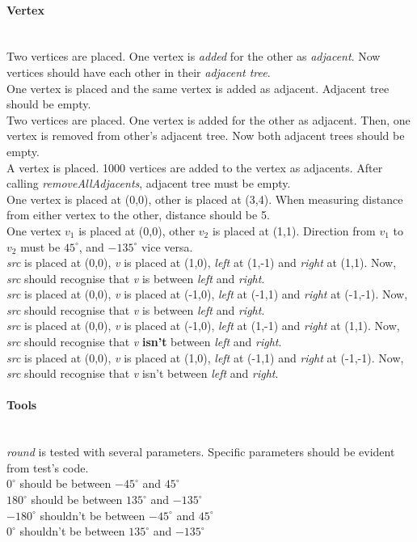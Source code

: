 \documentclass[a4paper,12pt]{article}
\begin{document}
\paragraph{\large Vertex} \hspace{0pt} \\
Two vertices are placed. One vertex is \emph{added} for the other as \emph{adjacent}. Now vertices should have each other in their \emph{adjacent tree}.\\
One vertex is placed and the same vertex is added as adjacent. Adjacent tree should be empty.\\
Two vertices are placed. One vertex is added for the other as adjacent. Then, one vertex is removed from other's adjacent tree. Now both adjacent trees should be empty.\\
A vertex is placed. 1000 vertices are added to the vertex as adjacents. After calling \emph{removeAllAdjacents}, adjacent tree must be empty.\\
One vertex is placed at (0,0), other is placed at (3,4). When measuring distance from either vertex to the other, distance should be 5.\\
One vertex \emph{$v_1$} is placed at (0,0), other \emph{$v_2$} is placed at (1,1). Direction from \emph{$v_1$} to \emph{$v_2$} must be $45^{\circ}$, and $-135^{\circ}$ vice versa.\\
\emph{src} is placed at (0,0), \emph{v} is placed at (1,0), \emph{left} at (1,-1) and \emph{right} at (1,1). Now, \emph{src} should recognise that \emph{v} is between \emph{left} and \emph{right}.\\
\emph{src} is placed at (0,0), \emph{v} is placed at (-1,0), \emph{left} at (-1,1) and \emph{right} at (-1,-1). Now, \emph{src} should recognise that \emph{v} is between \emph{left} and \emph{right}.\\
\emph{src} is placed at (0,0), \emph{v} is placed at (-1,0), \emph{left} at (1,-1) and \emph{right} at (1,1). Now, \emph{src} should recognise that \emph{v} \textbf{isn't} between \emph{left} and \emph{right}.\\
\emph{src} is placed at (0,0), \emph{v} is placed at (1,0), \emph{left} at (-1,1) and \emph{right} at (-1,-1). Now, \emph{src} should recognise that \emph{v} isn't between \emph{left} and \emph{right}.\\

\paragraph{\large Tools} \hspace{0pt} \\
\emph{round} is tested with several parameters. Specific parameters should be evident from test's code.\\
$0^{\circ}$ should be between $-45^{\circ}$ and $45^{\circ}$\\
$180^{\circ}$ should be between $135^{\circ}$ and $-135^{\circ}$\\
$-180^{\circ}$ shouldn't be between $-45^{\circ}$ and $45^{\circ}$\\
$0^{\circ}$ shouldn't be between $135^{\circ}$ and $-135^{\circ}$\\
\end{document}
